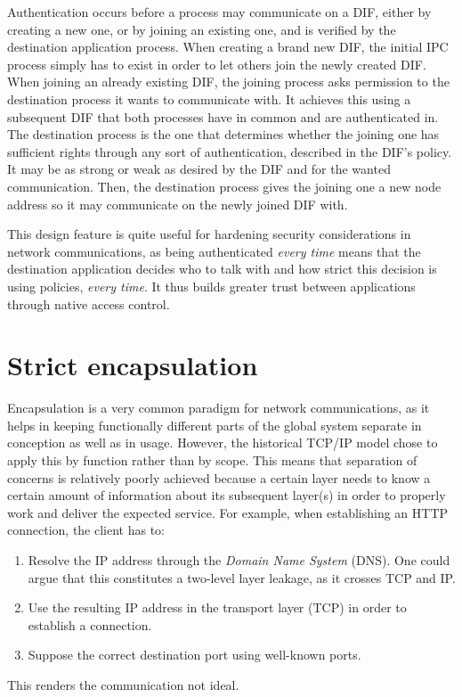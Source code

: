 \documentclass[a4paper]{proc}
\begin{document}
Authentication occurs before a process may communicate on a DIF, either by
creating a new one, or by joining an existing one, and is verified by the
destination application process. When creating a brand new DIF, the initial IPC
process simply has to exist in order to let others join the newly created DIF.
When joining an already existing DIF, the joining process asks permission to the
destination process it wants to communicate with. It achieves this using a
subsequent DIF that both processes have in common and are authenticated in.  The
destination process is the one that determines whether the joining one has
sufficient rights through any sort of authentication, described in the DIF's
policy. It may be as strong or weak as desired by the DIF and for the wanted
communication. Then, the destination process gives the joining one a new node
address so it may communicate on the newly joined DIF with.

This design feature is quite useful for hardening security considerations in
network communications, as being authenticated \textit{every time} means that
the destination application decides who to talk with and how strict this
decision is using policies, \textit{every time}. It thus builds greater trust
between applications through native access control.

\section{Strict encapsulation}

Encapsulation is a very common paradigm for network communications, as it helps
in keeping functionally different parts of the global system separate in
conception as well as in usage. However, the historical TCP/IP model chose to
apply this by function rather than by scope. This means that separation of
concerns is relatively poorly achieved because a certain layer needs to know a
certain amount of information about its subsequent layer(s) in order to properly
work and deliver the expected service. For example, when establishing an HTTP
connection, the client has to:
\begin{enumerate}
    \item Resolve the IP address through the \textit{Domain Name System} (DNS).
        One could argue that this constitutes a two-level layer leakage, as it
        crosses TCP and IP.
    \item Use the resulting IP address in the transport layer (TCP) in order to
        establish a connection.
    \item Suppose the correct destination port using well-known ports.
\end{enumerate}
This renders the communication not ideal.
\end{document}
